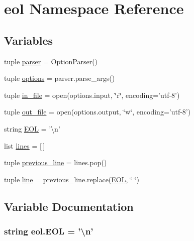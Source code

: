\hypertarget{namespaceeol}{\section{eol Namespace Reference}
\label{namespaceeol}
}
\subsection*{Variables}
\begin{DoxyCompactItemize}
\item 
tuple \hyperlink{namespaceeol_a8a05add7959e24b3aeae7e605d8a1828}{parser} = Option\+Parser()
\item 
tuple \hyperlink{namespaceeol_aa15858a183d9b65efbca9cf401bd0227}{options} = parser.\+parse\+\_\+args()
\item 
tuple \hyperlink{namespaceeol_af8d4f31a15a99500f2927c5c7c6f0206}{in\+\_\+file} = open(options.\+input, \char`\"{}r\char`\"{}, encoding='utf-\/8')
\item 
tuple \hyperlink{namespaceeol_a44bd6aa643636fce9c0f8aa2214eb4af}{out\+\_\+file} = open(options.\+output, \char`\"{}w\char`\"{}, encoding='utf-\/8')
\item 
string \hyperlink{namespaceeol_a8c0e818f50403d0d8776ea7e1b592133}{E\+O\+L} = '\textbackslash{}n'
\item 
list \hyperlink{namespaceeol_abeaa70f48fe541fa9a735489ca6e95ff}{lines} = \mbox{[}$\,$\mbox{]}
\item 
tuple \hyperlink{namespaceeol_a76b2223d0522fbcbbe9d3ed8c8af2375}{previous\+\_\+line} = lines.\+pop()
\item 
tuple \hyperlink{namespaceeol_a12767f8ab35a2de0036b1fdd5af23567}{line} = previous\+\_\+line.\+replace(\hyperlink{namespaceeol_a8c0e818f50403d0d8776ea7e1b592133}{E\+O\+L}, \char`\"{} \char`\"{})
\end{DoxyCompactItemize}


\subsection{Variable Documentation}
\hypertarget{namespaceeol_a8c0e818f50403d0d8776ea7e1b592133}{
\subsubsection[{E\+O\+L}]{\setlength{\rightskip}{0pt plus 5cm}string eol.\+E\+O\+L = '\textbackslash{}n'}}\label{namespaceeol_a8c0e818f50403d0d8776ea7e1b592133}


